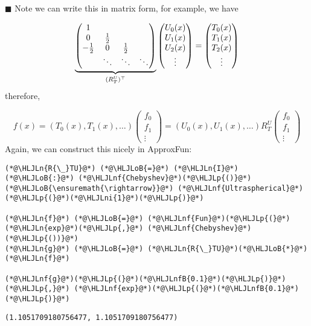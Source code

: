 \documentclass[12pt,landscape]{article}
\newcommand{\HLJLn}[1]{#1}
\newcommand{\HLJLnf}[1]{\textcolor[RGB]{66,102,213}{#1}}
\newcommand{\HLJLnfB}[1]{\textcolor[RGB]{59,151,46}{#1}}
\newcommand{\HLJLni}[1]{\textcolor[RGB]{59,151,46}{#1}}
\newcommand{\HLJLoB}[1]{\textcolor[RGB]{102,102,102}{\textbf{#1}}}
\newcommand{\HLJLp}[1]{#1}
\def\half{ {1 \over 2} }
\begin{document}
{\ensuremath{\blacksquare}
\newpage
Note we can write this in matrix form, for example, we have

\[
\underbrace{\begin{pmatrix}1 \cr
                    0 & \half\cr
                       -\half & 0 & \half \cr
                           &\ddots &\ddots & \ddots\end{pmatrix} }_{(R_T^U)^\top} \begin{pmatrix}
                           U_0(x) \\ U_1(x) \\ U_2(x) \\ \vdots \end{pmatrix}  =  \begin{pmatrix} T_0(x) \\ T_1(x) \\ T_2(x) \\ \vdots \end{pmatrix}
\]
therefore,

\[
f(x) =  (T_0(x),T_1(x),\ldots) \begin{pmatrix} f_0\\f_1\\\vdots \end{pmatrix} =  (U_0(x),U_1(x),\ldots) R_T^U \begin{pmatrix} f_0\\f_1\\\vdots \end{pmatrix}
\]
Again, we can construct this nicely in ApproxFun:


\begin{lstlisting}
(*@\HLJLn{R{\_}TU}@*) (*@\HLJLoB{=}@*) (*@\HLJLn{I}@*) (*@\HLJLoB{:}@*) (*@\HLJLnf{Chebyshev}@*)(*@\HLJLp{()}@*) (*@\HLJLoB{\ensuremath{\rightarrow}}@*) (*@\HLJLnf{Ultraspherical}@*)(*@\HLJLp{(}@*)(*@\HLJLni{1}@*)(*@\HLJLp{)}@*)

(*@\HLJLn{f}@*) (*@\HLJLoB{=}@*) (*@\HLJLnf{Fun}@*)(*@\HLJLp{(}@*)(*@\HLJLn{exp}@*)(*@\HLJLp{,}@*) (*@\HLJLnf{Chebyshev}@*)(*@\HLJLp{())}@*)
(*@\HLJLn{g}@*) (*@\HLJLoB{=}@*) (*@\HLJLn{R{\_}TU}@*)(*@\HLJLoB{*}@*)(*@\HLJLn{f}@*)

(*@\HLJLnf{g}@*)(*@\HLJLp{(}@*)(*@\HLJLnfB{0.1}@*)(*@\HLJLp{)}@*) (*@\HLJLp{,}@*) (*@\HLJLnf{exp}@*)(*@\HLJLp{(}@*)(*@\HLJLnfB{0.1}@*)(*@\HLJLp{)}@*)
\end{lstlisting}

\begin{lstlisting}
(1.1051709180756477, 1.1051709180756477)
\end{lstlisting}


}
\end{document}
